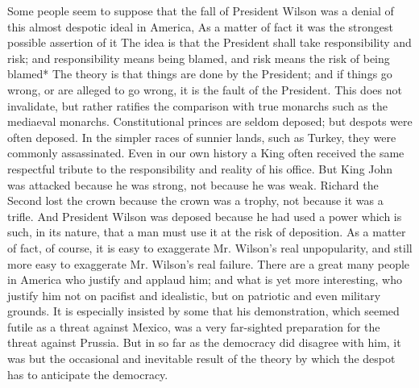 \documentclass{book}
\begin{document}
Some people seem to suppose that the fall of President Wilson was a denial of this almost despotic ideal in America, As a matter of fact it was the strongest possible assertion of it The idea is that the President shall take responsibility and risk; and responsibility means being blamed, and risk means the risk of being blamed* The theory is that things are done by the President; and if things go wrong, or are alleged to go wrong, it is the fault of the President. This does not invalidate, but rather ratifies the comparison with true monarchs such as the mediaeval monarchs. Constitutional princes are seldom deposed; but despots were often deposed. In the simpler races of sunnier lands, such as Turkey, they were commonly assassinated. Even in our own history a King often received the same respectful tribute to the responsibility and reality of his office. But King John was attacked because he was strong, not because he was weak. Richard the Second lost the crown because the crown was a trophy, not because it was a trifle. And President Wilson was deposed because he had used a power which is such, in its nature, that a man must use it at the risk of deposition. As a matter of fact, of course, it is easy to exaggerate Mr. Wilson’s real unpopularity, and still more easy to exaggerate Mr. Wilson’s real failure. There are a great many people in America who justify and applaud him; and what is yet more interesting, who justify him not on pacifist and idealistic, but on patriotic and even military grounds. It is especially insisted by some that his demonstration, which seemed futile as a threat against Mexico, was a very far-sighted preparation for the threat against Prussia. But in so far as the democracy did disagree with him, it was but the occasional and inevitable result of the theory by which the despot has to anticipate the democracy.
\end{document}
